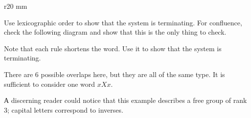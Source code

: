 \begin{wrapfigure}{r}{20 mm}
\vskip-2mm
{
\centering
{}
}
\end{wrapfigure}

\parit{\ref{ex:convergent:b}}
Use lexicographic order to show that the system is terminating.
For confluence, check the following diagram and show that this is the only thing to check.


\parit{\ref{ex:convergent:c}}
Note that each rule shortens the word.
Use it to show that the system is terminating.

There are 6 possible overlaps here, but they are all of the same type.
It is sufficient to consider one word $xXx$.

А discerning reader could notice that this example describes a free group of rank 3;
capital letters correspond to inverses. 

\spell{\end{multicols}}{}
\newpage
